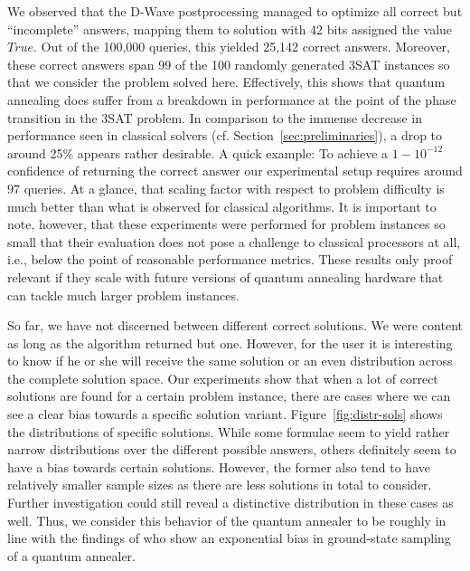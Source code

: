 We observed that the D-Wave postprocessing managed to optimize all correct but ``incomplete'' answers, mapping them to solution with 42 bits assigned the value $\textit{True}$. Out of the 100,000 queries, this yielded 25,142 correct answers. Moreover, these correct answers span 99 of the 100 randomly generated 3SAT instances so that we consider the problem solved here. Effectively, this shows that quantum annealing does suffer from a breakdown in performance at the point of the phase transition in the 3SAT problem. In comparison to the immense decrease in performance seen in classical solvers (cf. Section~\ref{sec:preliminaries}), a drop to around 25\% appears rather desirable. A quick example: To achieve a $1 - 10^{-12}$ confidence of returning the correct answer our experimental setup requires around $97$ queries. At a glance, that scaling factor with respect to problem difficulty is much better than what is observed for classical algorithms. It is important to note, however, that these experiments were performed for problem instances so small that their evaluation does not pose a challenge to classical processors at all, i.e., below the point of reasonable performance metrics. These results only proof relevant if they scale with future versions of quantum annealing hardware that can tackle much larger problem instances.

So far, we have not discerned between different correct solutions. We were content as long as the algorithm returned but one. However, for the user it is interesting to know if he or she will receive the same solution or an even distribution across the complete solution space. Our experiments show that when a lot of correct solutions are found for a certain problem instance, there are cases where we can see a clear bias towards a specific solution variant. Figure~\ref{fig:distr-sols} shows the distributions of specific solutions. While some formulae seem to yield rather narrow distributions over the different possible answers, others definitely seem to have a bias towards certain solutions. However, the former also tend to have relatively smaller sample sizes as there are less solutions in total to consider. Further investigation could still reveal a distinctive distribution in these cases as well. Thus, we consider this behavior of the quantum annealer to be roughly in line with the findings of \cite{mandra2017exponentially} who show an exponential bias in ground-state sampling of a quantum annealer.

